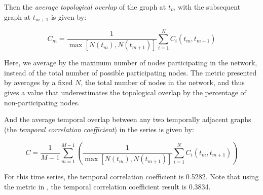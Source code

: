 \documentclass[12pt]{article}
\begin{document}
Then the \emph{average topological overlap} of the graph at \(t_m\) with the subsequent graph at \(t_{m+1}\) is given by:

\begin{equation}
C_m = \frac{1}{\max [N(t_m),N(t_{m+1})]} \sum_{i = 1}^{N} C_i(t_m,t_{m+1})
\label{eq:Cm2}
\end{equation}

Here, we average by the maximum number of nodes participating in the network, instead of the total number of possible participating nodes. The metric presented by \cite{3} averages by a fixed \(N\), the total number of nodes in the network, and thus gives a value that underestimates the topological overlap by the percentage of non-participating nodes.

And the average temporal overlap between any two temporally adjacent graphs (the \emph{temporal correlation coefficient}) in the series is given by:

\begin{equation}
C = \frac{1}{M-1}\sum_{m=1}^{M-1}  \left( \frac{1}{\max [N(t_m),N(t_{m+1})]} \sum_{i = 1}^{N} C_i(t_m,t_{m+1}) \right)
\label{eq:C2}
\end{equation}

For this time series, the temporal correlation coefficient is 0.5282. Note that using the metric in \cite{3}, the temporal correlation coefficient result is 0.3834.
\end{document}
